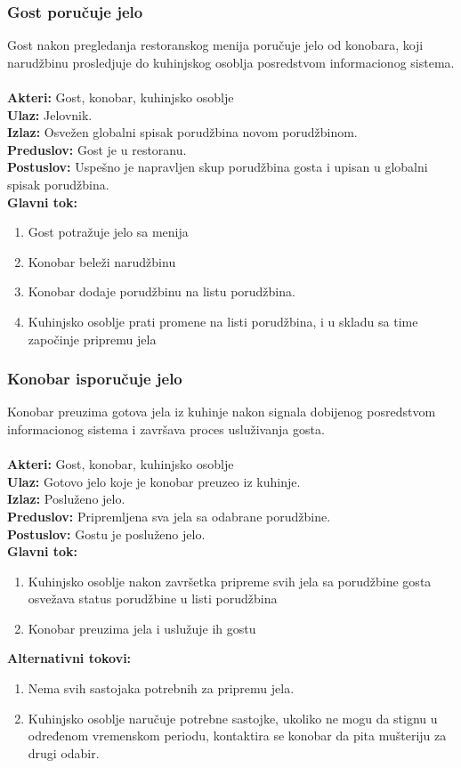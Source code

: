 \documentclass{article}
\begin{document}
\subsubsection{Gost poručuje jelo}
Gost nakon pregledanja restoranskog menija poručuje jelo od konobara, koji narudžbinu prosledjuje do kuhinjskog osoblja posredstvom informacionog sistema.\\\\
\textbf{Akteri:} Gost, konobar, kuhinjsko osoblje\\
\textbf{Ulaz:} Jelovnik.\\
\textbf{Izlaz:} Osvežen globalni spisak porudžbina novom porudžbinom.\\
\textbf{Preduslov:} Gost je u restoranu.\\
\textbf{Postuslov:} Uspešno je napravljen skup porudžbina gosta i upisan u globalni spisak porudžbina.\\
\textbf{Glavni tok:}
\begin{enumerate}
\item Gost potražuje jelo sa menija
\item Konobar beleži narudžbinu 
\item Konobar dodaje porudžbinu na listu porudžbina.
\item Kuhinjsko osoblje prati promene na listi porudžbina, i u skladu sa time započinje pripremu jela \\
\end{enumerate}

\subsubsection{Konobar isporučuje jelo}
Konobar preuzima gotova jela iz kuhinje nakon signala dobijenog posredstvom informacionog sistema i završava proces usluživanja gosta.\\\\
\textbf{Akteri:} Gost, konobar, kuhinjsko osoblje\\
\textbf{Ulaz:} Gotovo jelo koje je konobar preuzeo iz kuhinje.\\
\textbf{Izlaz:} Posluženo jelo.\\
\textbf{Preduslov:} Pripremljena sva jela sa odabrane porudžbine.\\
\textbf{Postuslov:} Gostu je posluženo jelo.\\
\textbf{Glavni tok:}
\begin{enumerate}
\item Kuhinjsko osoblje nakon završetka pripreme svih jela sa porudžbine gosta osvežava status porudžbine u listi porudžbina
\item Konobar preuzima jela i uslužuje ih gostu \\
\end{enumerate}
\textbf{Alternativni tokovi:}
\begin{enumerate}
\item Nema svih sastojaka potrebnih za pripremu jela.
\item Kuhinjsko osoblje naručuje potrebne sastojke, ukoliko ne mogu da stignu u određenom vremenskom periodu, kontaktira se konobar da pita mušteriju za drugi odabir. 
\end{enumerate}
\end{document}
